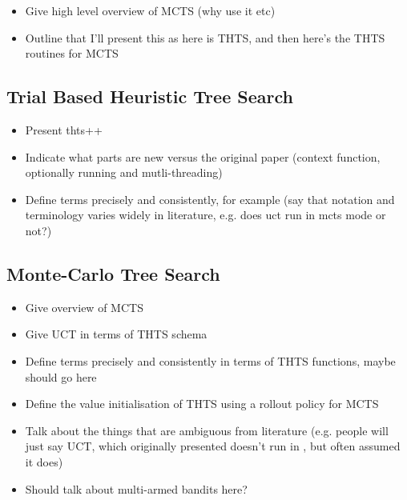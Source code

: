     \begin{itemize}
        \item Give high level overview of MCTS (why use it etc)
        \item Outline that I'll present this as here is THTS, and then here's the THTS routines for MCTS
    \end{itemize}

    \subsection{Trial Based Heuristic Tree Search}
    \label{sec:2-2-1-thts}
    
        \begin{itemize}
            \item Present thts++
            \item Indicate what parts are new versus the original paper (context function, optionally running \mctsmode\ewe and mutli-threading)
            \item Define terms precisely and consistently, for example \mctsmode\ewe (say that notation and terminology varies widely in literature, e.g. does uct run in mcts mode or not?)
        \end{itemize}

    \subsection{Monte-Carlo Tree Search}
    \label{sec:2-2-2-mcts}

        \begin{itemize}
            \item Give overview of MCTS
            \item Give UCT in terms of THTS schema 
            \item Define terms precisely and consistently in terms of THTS functions, maybe \mctsmode\ewe should go here
            \item Define the value initialisation of THTS using a rollout policy for MCTS
            \item Talk about the things that are ambiguous from literature (e.g. people will just say UCT, which originally presented doesn't run in \mctsmode, but often assumed it does)
            \item Should talk about multi-armed bandits here?
        \end{itemize}
    
